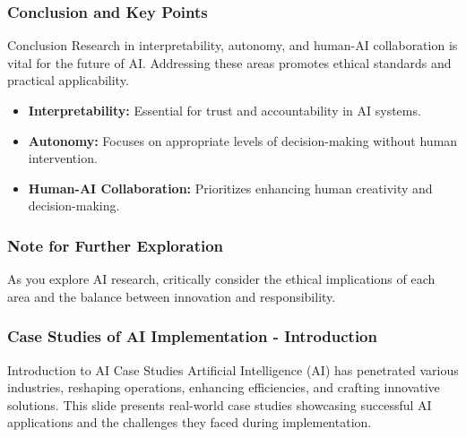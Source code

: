 \documentclass{beamer}
\begin{document}
\begin{frame}[fragile]
    \frametitle{Conclusion and Key Points}
    \begin{block}{Conclusion}
        Research in interpretability, autonomy, and human-AI collaboration is vital for the future of AI. Addressing these areas promotes ethical standards and practical applicability.
    \end{block}
    \begin{itemize}
        \item \textbf{Interpretability:} Essential for trust and accountability in AI systems.
        \item \textbf{Autonomy:} Focuses on appropriate levels of decision-making without human intervention.
        \item \textbf{Human-AI Collaboration:} Prioritizes enhancing human creativity and decision-making.
    \end{itemize}
\end{frame}

\begin{frame}[fragile]
    \frametitle{Note for Further Exploration}
    As you explore AI research, critically consider the ethical implications of each area and the balance between innovation and responsibility.
\end{frame}

\begin{frame}[fragile]
    \frametitle{Case Studies of AI Implementation - Introduction}
    \begin{block}{Introduction to AI Case Studies}
    Artificial Intelligence (AI) has penetrated various industries, reshaping operations, enhancing efficiencies, and crafting innovative solutions. 
    This slide presents real-world case studies showcasing successful AI applications and the challenges they faced during implementation.
    \end{block}
\end{frame}
\end{document}
